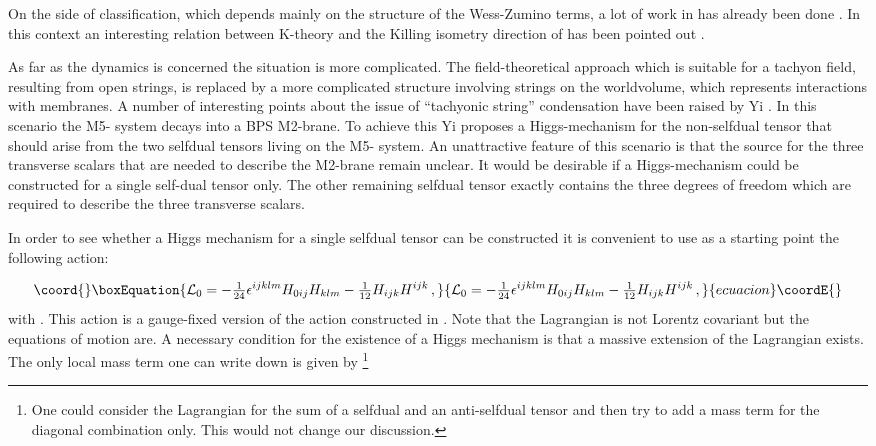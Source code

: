 \documentclass[12pt,a4paper]{article}
\begin{document}
On the side of classification, which depends mainly on the
 structure of the Wess-Zumino terms, a lot of work in \coordHE{}
 has already been done \cite{Lo1,Lo2}. In this context an interesting
relation between K-theory and the Killing isometry direction of
\cite{Killing} has been pointed out \cite{Vancea}.

As far as the dynamics is concerned the situation is more complicated.
The field-theoretical approach
 which is suitable for a tachyon field, resulting from open strings, is
 replaced by a more complicated structure involving strings on the
 worldvolume, which represents interactions with membranes.
 A number of interesting points about the issue of
 ``tachyonic string'' condensation have been raised by Yi
 \cite{Yi}. In this scenario the M5-\coordHE{} system decays into
a BPS M2-brane.
To achieve this Yi proposes a Higgs-mechanism for the non-selfdual tensor that
should arise from the two selfdual tensors living on the
M5-\coordHE{} system. An unattractive feature of this scenario
is that the source for the three transverse scalars that are needed to
describe the M2-brane remain unclear. It would be desirable if
a Higgs-mechanism could be constructed for a single self-dual tensor only.
The other remaining selfdual tensor exactly contains the three degrees
of freedom which are required to describe the three transverse scalars.

In order to see whether a Higgs mechanism for a single selfdual tensor
can be constructed it is convenient to use as a starting point
the following action:


\begin{equation}\coord{}\boxEquation{
{\cal L}_0 = -{\textstyle{1\over 24}}\epsilon^{ijklm}H_{0ij}H_{klm}
-{\textstyle{1\over 12}}H_{ijk}H^{ijk}\,,
}{
{\cal L}_0 = -{\textstyle{1\over 24}}\epsilon^{ijklm}H_{0ij}H_{klm}
-{\textstyle{1\over 12}}H_{ijk}H^{ijk}\,,
}{ecuacion}\coordE{}\end{equation}
with \coordHE{}.
This action is a gauge-fixed version of the action constructed in \cite{PST}.
Note that the Lagrangian is not Lorentz covariant but the equations of
motion are. A necessary condition for the existence of a Higgs mechanism
is that a massive extension of the Lagrangian \coordHE{} exists.
The only local mass term one can write down is given by
\footnote{One could consider
the Lagrangian for the sum of a selfdual and an anti-selfdual tensor
and then try to add a mass term for the diagonal combination only.
This would not change our discussion.}
\end{document}
